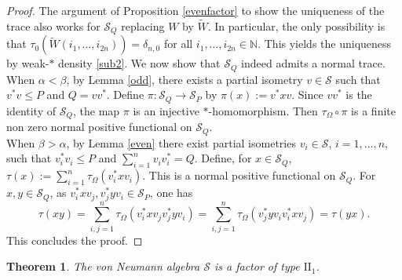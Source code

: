 \documentclass[12pt]{amsart}
\numberwithin{equation}{section}
\def\bn{{\mathbb N}}
\def\a{\alpha}
\def\b{\beta}
\newtheorem{thm}{Theorem}[section]
\theoremstyle{definition}
\begin{document}
\begin{proof}
 The argument of Proposition \ref{evenfactor} to show the uniqueness of the trace also works for $\mathcal S_Q$ replacing $W$ by $\widetilde W$. In particular,
 the only possibility is that  $\tau_0(\widetilde W(i_1,\ldots,i_{2n}))=\delta_{n,0}$ for all $i_1,\ldots,i_{2n}\in\bn$. This yields the uniqueness by weak-$*$ density \eqref{sub2}.
 We now show that $\mathcal S_Q$ indeed admits a normal trace.\\
When $\a<\b$, by Lemma \ref{odd}, there exists a partial isometry
  $v\in\mathcal{S}$ such that $v^*v\leq P$ and $Q=vv^*$. Define
  $\pi:\mathcal{S}_Q\rightarrow \mathcal{S}_P$ by
  $\pi(x):=v^*xv$. Since $vv^*$ is the identity of $\mathcal{S}_Q$,
  the map $\pi$ is an injective $*$-homomorphism. Then
  $\tau_\Omega\circ \pi$ is a finite non zero normal positive functional on $\mathcal{S}_Q$.\\
When $\b>\a$, by Lemma \ref{even} there exist partial isometries
  $v_i\in\mathcal{S}$, $i=1,\ldots,n$, such that $ v_i^*v_i\leq P$ and
  $\sum_{i=1}^n v_iv_i^*=Q$.  Define, for $x\in\mathcal S_Q$,
  $\tau(x):=\sum_{i=1}^n \tau_\Omega(v_i^*xv_i)$. This is a normal positive functional on $\mathcal S_Q$. For $x,y\in\mathcal S_Q$, as $v_i^*xv_j, v_j^*yv_i\in \mathcal S_P$, one has
  $$\tau(xy)=\sum_{i,j=1}^n \tau_\Omega(v_i^*xv_jv_j^*yv_i)
  =\sum_{i,j=1}^n \tau_\Omega(v_j^*yv_iv_i^*xv_j)=\tau(yx).$$
  This concludes the proof.
\end{proof}

\begin{thm}\label{factorr}
The von Neumann algebra $\mathcal{S}$ is a
  factor of type $\text{II}_1$.
  \end{thm}
\end{document}
